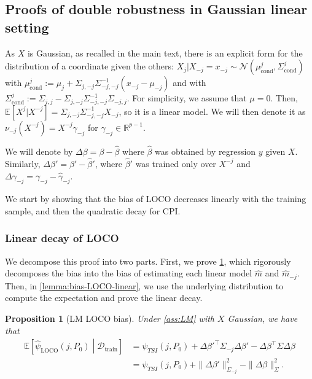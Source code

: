 \documentclass{article}
\theoremstyle{plain}
\newtheorem{proposition}[theorem]{Proposition}
\theoremstyle{definition}
\theoremstyle{remark}
\newcommand{\e}[1]{\mathbb{E}\left[#1\right]  } %
\begin{document}
\subsection{Proofs of double robustness in Gaussian linear setting}
As $X$ is Gaussian, as recalled in the main text, there is an explicit form for the distribution of a coordinate given the others: $X_{j}|X_{-j}=x_{-j}\sim \mathcal{N}(\mu^j_\mathrm{cond}, \Sigma^j_\mathrm{cond})$ 
with $\mu^j_\mathrm{cond}:=\mu_{j}+\Sigma_{j, -j}\Sigma^{-1}_{-j, -j}(x_{-j}-\mu_{-j})$ and with $\Sigma^j_\mathrm{cond}:=\Sigma_{j, j}-\Sigma_{j,-j}\Sigma^{-1}_{-j, -j}\Sigma_{-j, j}$.
For simplicity, we assume that $\mu=0$. Then, $\e{X^j| X^{-j}} = \Sigma_{j, -j}\Sigma^{-1}_{-j, -j}X_{-j}$, so it is a linear model. We will then denote it as $\nu_{-j}(X^{-j})=X^{-j}\gamma_{-j}$ for $\gamma_{-j}\in \mathbb{R}^{p-1}$. 

We will denote by $\Delta\beta = \beta - \widehat{\beta}$ where $\widehat{\beta}$ was obtained by regression $y$ given $X$. Similarly, $\Delta \beta '= \beta' -\widehat{\beta}' $, where $\widehat{\beta}'$ was trained only over $X^{-j}$ and $\Delta\gamma_{-j}=\gamma_{-j}-\widehat{\gamma}_{-j}$.

We start by showing that the bias of LOCO decreases linearly with the training sample, and then the quadratic decay for CPI.


\subsubsection{Linear decay of LOCO}

We decompose this proof into two parts. First, we prove \cref{prop:LM-LOCO-bias}, which rigorously decomposes the bias into the bias of estimating each linear model $\widehat{m}$ and $\widehat{m}_{-j}$. Then, in \cref{lemma:bias-LOCO-linear}, we use the underlying distribution to compute the expectation and prove the linear decay.


\begin{proposition}[LM LOCO bias]
    Under \cref{ass:LM} with $X$ Gaussian, we have that \begin{align*}
        \e{\widehat{\psi}_\mathrm{LOCO}(j, P_0)\middle|\mathcal{D}_\mathrm{train}}&=\psi_{TSI}(j, P_0)+\Delta\beta'^\top\Sigma_{-j}\Delta\beta'-\Delta\beta^\top\Sigma\Delta\beta\\&=\psi_{TSI}(j, P_0)+\|\Delta\beta'\|^2_{\Sigma_{-j}}-\|\Delta\beta\|^2_\Sigma. 
    \end{align*}\label{prop:LM-LOCO-bias}
\end{proposition}
\end{document}

